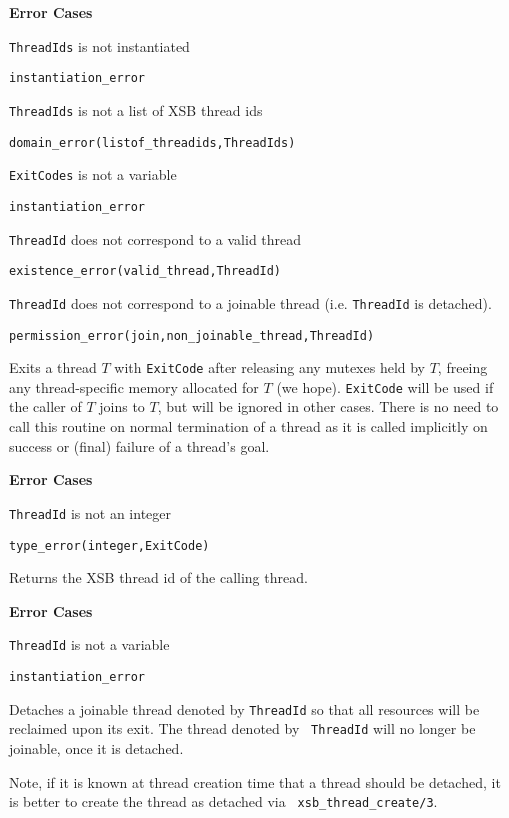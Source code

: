 \begin{description}
{\bf Error Cases}
\bi
\item 	{\tt ThreadIds} is not instantiated
\bi
\item 	{\tt instantiation\_error}
\ei
%
\item 	{\tt ThreadIds} is not a list of XSB thread ids
\bi
\item 	{\tt domain\_error(listof\_threadids,ThreadIds)}
\ei
%
\item 	{\tt ExitCodes} is not a variable
\bi
\item 	{\tt instantiation\_error}
\ei
%
\item   {\tt ThreadId} does not correspond to a valid thread
\bi
\item   {\tt existence\_error(valid\_thread,ThreadId)}
\ei
\item   {\tt ThreadId} does not correspond to a joinable thread
  (i.e. {\tt ThreadId} is detached).
\bi
\item   {\tt permission\_error(join,non\_joinable\_thread,ThreadId)}
\ei
\ei

%
Exits a thread $T$ with {\tt ExitCode} after releasing any mutexes
held by $T$, freeing any thread-specific memory allocated for $T$ (we
hope).  {\tt ExitCode} will be used if the caller of $T$ joins to $T$,
but will be ignored in other cases.  There is no need to call this
routine on normal termination of a thread as it is called implicitly
on success or (final) failure of a thread's goal.

{\bf Error Cases}
\bi
\item 	{\tt ThreadId} is not an integer
\bi
\item 	{\tt type\_error(integer,ExitCode)}
\ei
\ei

%
Returns the XSB thread id of the calling thread.

{\bf Error Cases}
\bi
\item 	{\tt ThreadId} is not a variable
\bi
\item 	{\tt instantiation\_error}
\ei
\ei

%
Detaches a joinable thread denoted by {\tt ThreadId} so that all
resources will be reclaimed upon its exit.  The thread denoted by {\tt
  ThreadId} will no longer be joinable, once it is detached.

Note, if it is known at thread creation time that a thread should be
detached, it is better to create the thread as detached via {\tt
  xsb\_thread\_create/3}.


\end{description}
